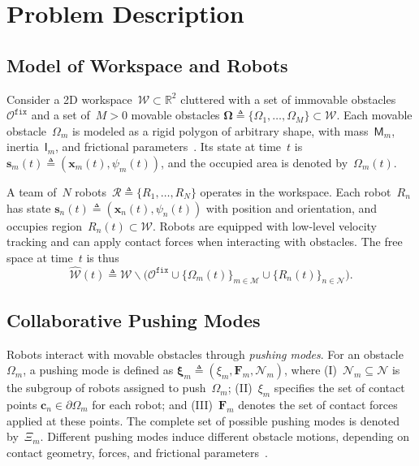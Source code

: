 \section{Problem Description}\label{sec:problem}

\subsection{Model of Workspace and Robots}\label{subsec:ws}

Consider a 2D workspace~$\mathcal{W}\subset \mathbb{R}^2$ cluttered with a set of
immovable obstacles~$\mathcal{O}^{\texttt{fix}}$ and a set of~$M>0$ movable obstacles
$\boldsymbol{\Omega}\triangleq\{\Omega_1,\ldots,\Omega_M\}\subset\mathcal{W}$.
Each movable obstacle~$\Omega_m$ is modeled as a rigid polygon of arbitrary shape,
with mass~$\mathsf{M}_m$, inertia~$\mathsf{I}_m$, and frictional parameters~\cite{}.
Its state at time~$t$ is $\mathbf{s}_m(t)\triangleq(\mathbf{x}_m(t),\psi_m(t))$,
and the occupied area is denoted by~$\Omega_m(t)$.

A team of~$N$ robots~$\mathcal{R}\triangleq\{R_1,\ldots,R_N\}$ operates in the workspace.
Each robot~$R_n$ has state $\mathbf{s}_n(t)\triangleq(\mathbf{x}_n(t),\psi_n(t))$
with position and orientation, and occupies region~$R_n(t)\subset\mathcal{W}$.
Robots are equipped with low-level velocity tracking and can apply contact forces
when interacting with obstacles. The free space at time~$t$ is thus
\[
\widehat{\mathcal{W}}(t) \triangleq
\mathcal{W}\backslash \big(\mathcal{O}^{\texttt{fix}}
  \cup \{\Omega_m(t)\}_{m\in\mathcal{M}}
  \cup \{R_n(t)\}_{n\in\mathcal{N}}\big).
\]

\subsection{Collaborative Pushing Modes}\label{ss:interaction_mode}

Robots interact with movable obstacles through \emph{pushing modes}.
For an obstacle~$\Omega_m$, a pushing mode is defined as
$\boldsymbol{\xi}_m\triangleq(\xi_m,\mathbf{F}_m,\mathcal{N}_m)$, where
(I)~$\mathcal{N}_m\subseteq\mathcal{N}$ is the subgroup of robots assigned
to push~$\Omega_m$;
(II)~$\xi_m$ specifies the set of contact points
$\mathbf{c}_n\in\partial\Omega_m$ for each robot;
and (III)~$\mathbf{F}_m$ denotes the set of contact forces applied at these points.
The complete set of possible pushing modes is denoted by~$\Xi_m$.
Different pushing modes induce different obstacle motions, depending on
contact geometry, forces, and frictional parameters~\cite{}.

